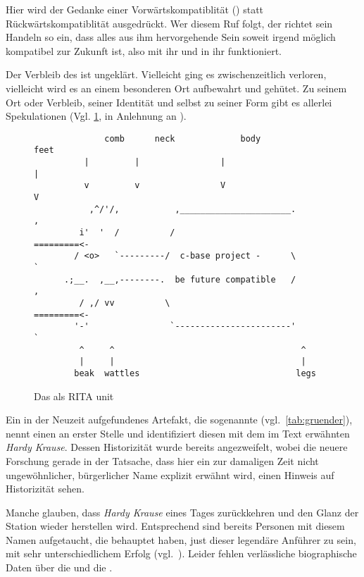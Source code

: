 Hier wird der Gedanke einer Vorwärtskompatiblität () statt Rückwärtskompatiblität ausgedrückt. Wer diesem Ruf folgt, der richtet sein Handeln so ein, dass alles aus ihm hervorgehende Sein  soweit irgend möglich kompatibel zur Zukunft ist, also mit ihr und in ihr funktioniert.

Der Verbleib des  ist ungeklärt. Vielleicht ging es zwischenzeitlich verloren, vielleicht wird es an einem besonderen Ort aufbewahrt und gehütet. Zu seinem Ort oder Verbleib, seiner Identität und selbst zu seiner Form gibt es allerlei Spekulationen (Vgl. \cref{fig:chicken}, in Anlehnung an \cite{rfc2321bressen}).  


\begin{figure}[ht!]
    \centering\small
    \begin{verbatim}
              comb      neck             body                    feet
          |         |                |                       |
          v         v                V                       V
           ,^/'/,           ,______________________.         ,
         i'  '  /          /                       =========<-
        / <o>   `---------/  c-base project -      \         `
      .;__.  ,__,--------.  be future compatible   /         ,
         / ,/ vv          \                        =========<-
        '-'                `-----------------------'         `
         ^     ^                                     ^
         |     |                                     |
        beak  wattles                               legs
    \end{verbatim}
    \caption{Das  als RITA unit}
    \label{fig:chicken}
\end{figure}

Ein in der Neuzeit aufgefundenes Artefakt, die sogenannte  (vgl.~\cref{tab:gruender}), nennt einen  an erster Stelle und identifiziert diesen mit dem im Text erwähnten \emph{Hardy Krause}. Dessen Historizität wurde bereits angezweifelt, wobei die neuere Forschung gerade in der Tatsache, dass hier ein zur damaligen Zeit nicht ungewöhnlicher, bürgerlicher Name explizit erwähnt wird, einen Hinweis auf Historizität sehen. 

Manche glauben, dass \emph{Hardy Krause }eines Tages zurückkehren und den Glanz der Station wieder herstellen wird. Entsprechend sind bereits Personen mit diesem Namen aufgetaucht, die behauptet haben, just dieser legendäre Anführer zu sein, mit sehr unterschiedlichem Erfolg (vgl.~\cite{hardykrause}). Leider fehlen verlässliche biographische Daten über die  und die . 



